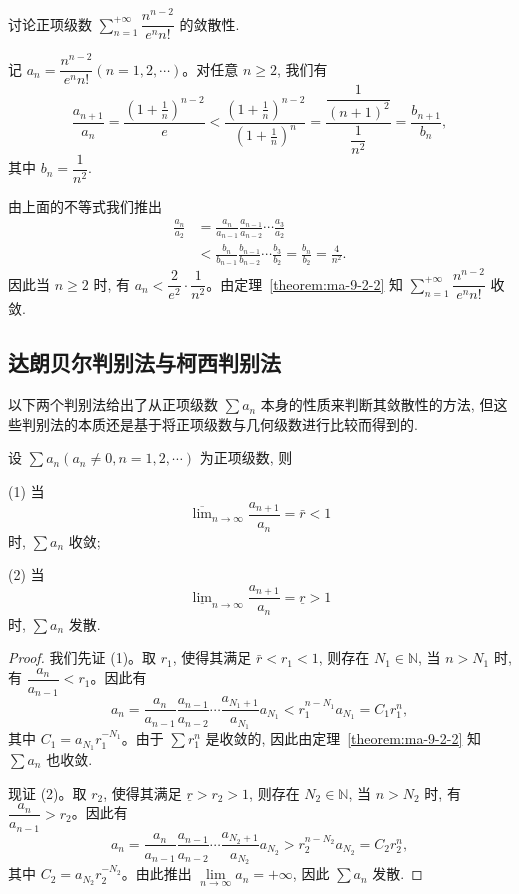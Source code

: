 \begin{example}\label{example:ma-9-2-5}
讨论正项级数 $\sum\limits_{n=1}^{+\infty}\dfrac{n^{n-2}}{e^n n!}$ 的敛散性.
\end{example}


\begin{solve}
记 $a_n=\dfrac{n^{n-2}}{e^n n!}(n=1,2,\cdots)$。对任意 $n\geq2$, 我们有
\[
  \frac{a_{n+1}}{a_n}
  =\frac{\left(1+\frac1n\right)^{n-2}}{e}
  <\frac{\left(1+\frac1n\right)^{n-2}}{\left(1+\frac1n\right)^n}
  =\frac{\dfrac1{(n+1)^2}}{\dfrac1{n^2}}
 =\frac{b_{n+1}}{b_n},
\]
其中 $b_n=\dfrac1{n^2}$.

由上面的不等式我们推出
\[
\begin{aligned}
  \frac{a_n}{a_2}
  &=\frac{a_n}{a_{n-1}}\frac{a_{n-1}}{a_{n-2}}\cdots\frac{a_3}{a_2}\\
  &<\frac{b_n}{b_{n-1}}\frac{b_{n-1}}{b_{n-2}}\cdots\frac{b_3}{b_2}
  =\frac{b_n}{b_2}=\frac4{n^2}.
\end{aligned}
\]
因此当 $n\geq2$ 时, 有 $a_n<\dfrac2{e^2}\cdot\dfrac1{n^2}$。由定理~\ref{theorem:ma-9-2-2} 知 $\sum\limits_{n=1}^{+\infty}\dfrac{n^{n-2}}{e^n n!}$ 收敛.
\end{solve}


\subsection{达朗贝尔判别法与柯西判别法}
\label{subsec:ma-9-2-2}

以下两个判别法给出了从正项级数 $\sum a_n$ 本身的性质来判断其敛散性的方法, 但这些判别法的本质还是基于将正项级数与几何级数进行比较而得到的.

\begin{theorem}\label{theorem:ma-9-2-3}
设 $\sum a_n(a_n\neq0,n=1,2,\cdots)$ 为正项级数, 则

(1) 当
\[
  \overline{\lim}_{n\to\infty}\frac{a_{n+1}}{a_n}=\bar r<1
\]
时, $\sum a_n$ 收敛;

(2) 当
\[
  \underline{\lim}_{n\to\infty}\frac{a_{n+1}}{a_n}=\underline r>1
\]
时, $\sum a_n$ 发散.
\end{theorem}


\begin{proof}
我们先证 (1)。取 $r_1$, 使得其满足 $\bar r<r_1<1$, 则存在 $N_1\in\mathbb{N}$, 当 $n>N_1$ 时, 有 $\dfrac{a_n}{a_{n-1}}<r_1$。因此有
\[
  a_n=\frac{a_n}{a_{n-1}}\frac{a_{n-1}}{a_{n-2}}\cdots\frac{a_{N_1+1}}{a_{N_1}}a_{N_1}
  <r_1^{n-N_1}a_{N_1}=C_1r_1^n,
\]
其中 $C_1=a_{N_1}r_1^{-N_1}$。由于 $\sum r_1^n$ 是收敛的, 因此由定理~\ref{theorem:ma-9-2-2} 知 $\sum a_n$ 也收敛.

现证 (2)。取 $r_2$, 使得其满足 $\underline r>r_2>1$, 则存在 $N_2\in\mathbb{N}$, 当 $n>N_2$ 时, 有 $\dfrac{a_n}{a_{n-1}}>r_2$。因此有
\[
  a_n=\frac{a_n}{a_{n-1}}\frac{a_{n-1}}{a_{n-2}}\cdots\frac{a_{N_2+1}}{a_{N_2}}a_{N_2}
  >r_2^{n-N_2}a_{N_2}=C_2r_2^n,
\]
其中 $C_2=a_{N_2}r_2^{-N_2}$。由此推出 $\lim\limits_{n\to\infty}a_n=+\infty$, 因此 $\sum a_n$ 发散.
\end{proof}


